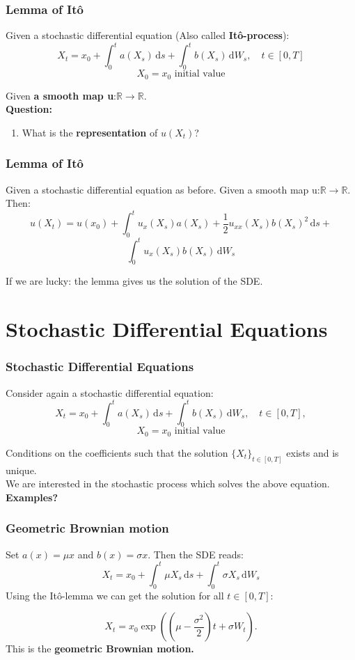 \begin{frame}
\frametitle{Lemma of It\^o}
Given a stochastic differential equation (Also called \textbf{It\^o-process}):
\[X_t = x_0 + \int_0^t \!a(X_s)\,\mathrm{d}s + \int_0^t \!b(X_s)\,\mathrm{d}W_{s},\quad t\in [0,T]\]
\[X_0 = x_0\,\,\text{initial value}\]

Given \textbf{a smooth map u}:\(\mathbb{R}\to\mathbb{R}\).\\

\textbf{Question:}
\begin{enumerate}
\item What is the \textbf{representation} of \(u(X_t)\)?
\end{enumerate}

\end{frame}


\begin{frame}
\frametitle{Lemma of It\^o}
Given a stochastic differential equation as before.
Given a smooth map u:\(\mathbb{R}\to\mathbb{R}\).\\

Then:
\[u(X_t)  = u(x_0) + \int_0^t \!u_x(X_s)a(X_s) + \frac{1}{2}u_{xx}(X_s)b(X_s)^2\,\mathrm{d}s +\]
\[ \int_0^t \!u_x(X_s)b(X_s)\,\mathrm{d}W_{s}\]

If we are lucky: the lemma gives us the solution of the SDE.
\end{frame}




\section{Stochastic Differential Equations} 

\begin{frame}
\frametitle{Stochastic Differential Equations}
Consider again a stochastic differential equation:
\[X_t = x_0 + \int_0^t \!a(X_s)\,\mathrm{d}s + \int_0^t \!b(X_s)\,\mathrm{d}W_{s},\quad t\in [0,T],\]
\[X_0 = x_0\,\,\text{initial value}\]

Conditions on the coefficients such that the solution \(\{X_t\}_{t\in[0,T]}\) exists and is unique.\\
We are interested in the stochastic process which solves the above equation.\\
\textbf{Examples?}
\end{frame}

\begin{frame}
\frametitle{Geometric Brownian motion}
Set \(a(x) = \mu x\) and \(b(x) = \sigma x\). Then the SDE reads:
\[X_t = x_0 + \int_0^t \!\mu X_s\,\mathrm{d}s + \int_0^t \!\sigma X_s\,\mathrm{d}W_{s}\]
Using the It\^o-lemma we can get the solution for all \(t\in[0,T]\):

\[X_t = x_0\exp({(\mu-\frac{\sigma^2}{2})t + \sigma W_t}).\]
This is the \textbf{geometric Brownian motion.}

\end{frame}


